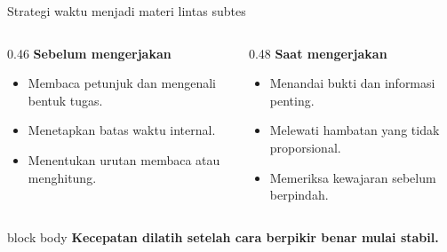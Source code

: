 \begin{frame}{Strategi waktu menjadi materi lintas subtes}
  \begin{columns}[T,onlytextwidth]
    \begin{column}{0.46\textwidth}
      {\color{StudentBlue}\bfseries Sebelum mengerjakan}\par
      \begin{itemize}
        \item Membaca petunjuk dan mengenali bentuk tugas.
        \item Menetapkan batas waktu internal.
        \item Menentukan urutan membaca atau menghitung.
      \end{itemize}
    \end{column}
    \begin{column}{0.48\textwidth}
      {\color{StudentBlue}\bfseries Saat mengerjakan}\par
      \begin{itemize}
        \item Menandai bukti dan informasi penting.
        \item Melewati hambatan yang tidak proporsional.
        \item Memeriksa kewajaran sebelum berpindah.
      \end{itemize}
    \end{column}
  \end{columns}
  \vspace{0.22cm}
  \begin{beamercolorbox}[rounded=true,sep=0.18cm,wd=\textwidth]{block body}
    \centering\bfseries Kecepatan dilatih setelah cara berpikir benar mulai stabil.
  \end{beamercolorbox}
\end{frame}

